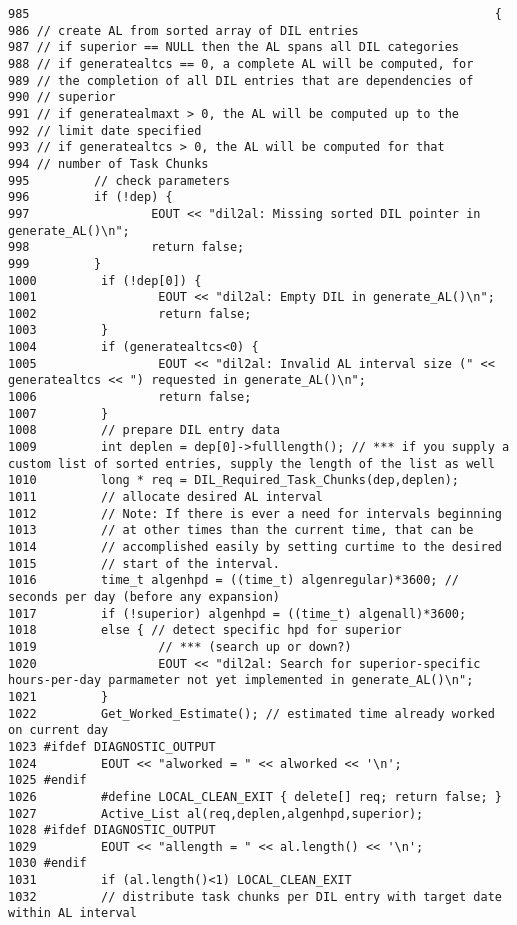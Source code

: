 \footnotesize\begin{verbatim}985                                                                 {
986 // create AL from sorted array of DIL entries
987 // if superior == NULL then the AL spans all DIL categories
988 // if generatealtcs == 0, a complete AL will be computed, for
989 // the completion of all DIL entries that are dependencies of
990 // superior
991 // if generatealmaxt > 0, the AL will be computed up to the
992 // limit date specified
993 // if generatealtcs > 0, the AL will be computed for that
994 // number of Task Chunks
995         // check parameters
996         if (!dep) {
997                 EOUT << "dil2al: Missing sorted DIL pointer in generate_AL()\n";
998                 return false;
999         }
1000         if (!dep[0]) {
1001                 EOUT << "dil2al: Empty DIL in generate_AL()\n";
1002                 return false;
1003         }
1004         if (generatealtcs<0) {
1005                 EOUT << "dil2al: Invalid AL interval size (" << generatealtcs << ") requested in generate_AL()\n";
1006                 return false;
1007         }
1008         // prepare DIL entry data
1009         int deplen = dep[0]->fulllength(); // *** if you supply a custom list of sorted entries, supply the length of the list as well
1010         long * req = DIL_Required_Task_Chunks(dep,deplen);
1011         // allocate desired AL interval
1012         // Note: If there is ever a need for intervals beginning
1013         // at other times than the current time, that can be
1014         // accomplished easily by setting curtime to the desired
1015         // start of the interval.
1016         time_t algenhpd = ((time_t) algenregular)*3600; // seconds per day (before any expansion)
1017         if (!superior) algenhpd = ((time_t) algenall)*3600;
1018         else { // detect specific hpd for superior
1019                 // *** (search up or down?)
1020                 EOUT << "dil2al: Search for superior-specific hours-per-day parmameter not yet implemented in generate_AL()\n";
1021         }
1022         Get_Worked_Estimate(); // estimated time already worked on current day
1023 #ifdef DIAGNOSTIC_OUTPUT
1024         EOUT << "alworked = " << alworked << '\n';
1025 #endif
1026         #define LOCAL_CLEAN_EXIT { delete[] req; return false; }
1027         Active_List al(req,deplen,algenhpd,superior);
1028 #ifdef DIAGNOSTIC_OUTPUT
1029         EOUT << "allength = " << al.length() << '\n';
1030 #endif
1031         if (al.length()<1) LOCAL_CLEAN_EXIT
1032         // distribute task chunks per DIL entry with target date within AL interval

\end{verbatim}
